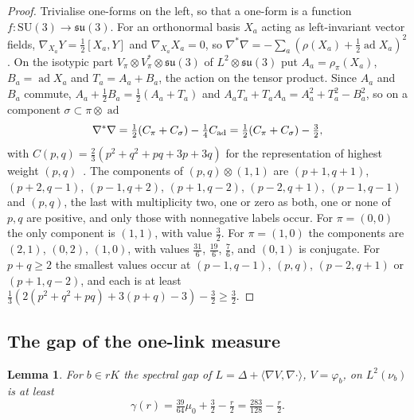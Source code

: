 \documentclass[11pt]{amsart}
\newtheorem{lemma}[theorem]{Lemma}
\theoremstyle{definition}
\theoremstyle{remark}
\numberwithin{equation}{section}
\newcommand{\SU}{\mathrm{SU}}
\newcommand{\ip}[2]{\langle #1,#2\rangle}
\begin{document}
\begin{proof}
Trivialise one-forms on the left, so that a one-form is a function
$f:\SU(3)\to\mathfrak{su}(3)$. For an orthonormal basis $X_a$ acting as
left-invariant vector fields, $\nabla_{X_a}Y=\frac12[X_a,Y]$ and
$\nabla_{X_a}X_a=0$, so $\nabla^*\nabla=-\sum_a(\rho(X_a)+\frac12\operatorname{ad}
X_a)^2$. On the isotypic part $V_\pi\otimes V_\pi^*\otimes\mathfrak{su}(3)$ of
$L^2\otimes\mathfrak{su}(3)$ put $A_a=\rho_\pi(X_a)$, $B_a=\operatorname{ad}X_a$
and $T_a=A_a+B_a$, the action on the tensor product. Since $A_a$ and $B_a$
commute, $A_a+\frac12B_a=\frac12(A_a+T_a)$ and $A_aT_a+T_aA_a=A_a^2+T_a^2-B_a^2$,
so on a component $\sigma\subset\pi\otimes\operatorname{ad}$
\[
\nabla^*\nabla=\tfrac12(C_\pi+C_\sigma)-\tfrac14C_{\rm ad}=\tfrac12(C_\pi+
C_\sigma)-\tfrac32 ,
\]
with $C(p,q)=\frac23(p^2+q^2+pq+3p+3q)$ for the representation of highest
weight $(p,q)$~\cite{FH91}. The components of $(p,q)\otimes(1,1)$
are $(p+1,q+1)$, $(p+2,q-1)$, $(p-1,q+2)$, $(p+1,q-2)$, $(p-2,q+1)$,
$(p-1,q-1)$ and $(p,q)$, the last with multiplicity two, one or zero as both,
one or none of $p,q$ are positive, and only those with nonnegative labels
occur. For $\pi=(0,0)$ the only component is $(1,1)$, with value
$\frac32$. For $\pi=(1,0)$ the components are $(2,1)$, $(0,2)$, $(1,0)$, with
values $\frac{31}6$, $\frac{19}6$, $\frac76$, and $(0,1)$ is conjugate. For
$p+q\ge2$ the smallest values occur at $(p-1,q-1)$, $(p,q)$, $(p-2,q+1)$ or
$(p+1,q-2)$, and each is at least $\frac13(2(p^2+q^2+pq)+3(p+q)-3)-\frac32\ge
\frac32$.
\end{proof}

\subsection{The gap of the one-link measure}

\begin{lemma}\label{lem:gap}
For $b\in rK$ the spectral gap of $L=\Delta+\ip{\nabla V}{\nabla\cdot}$,
$V=\varphi_b$, on $L^2(\nu_b)$ is at least
\[
\gamma(r)=\tfrac{39}{64}\mu_0+\tfrac32-\tfrac r2=\tfrac{283}{128}-\tfrac r2 .
\]
\end{lemma}
\end{document}
